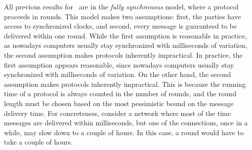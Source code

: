 
All previous results for \THC~are in the \emph{fully synchronous} model, where a protocol proceeds in rounds. This model makes
two assumptions: first, the parties have access to synchronized clocks, and 
second, every message is guaranteed to be delivered within one round.
While the first assumption is reasonable in practice, as nowadays computers 
usually stay synchronized with milliseconds of variation, the second assumption 
makes protocols inherently impractical.
In practice, the first assumption appears reasonable, since nowadays computers 
usually stay synchronized with milliseconds of variation. On the 
other hand, the second assumption makes protocols inherently impractical. 
This is because the running time of 
a protocol is always counted in the number of rounds, and the round length must be chosen based on the most pessimistic bound 
on the message delivery time.
For concreteness, consider a network where most of the time messages are delivered within milliseconds, but one of 
the connections, once in a while, may slow down to a couple of hours. In this 
case, a round would have to take a couple of hours.



